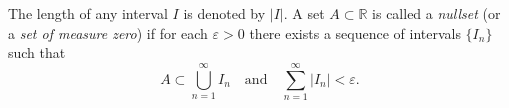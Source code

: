 The length of any interval $I$ is denoted by $|I|$. A set $A \subset \mathbb{R}$ is called a \textit{nullset} (or a \textit{set of measure zero}) if for each $\varepsilon > 0$ there exists a sequence of intervals $\{I_n\}$ such that
$$A \subset \bigcup_{n=1}^{\infty} I_n \quad\text{and}\quad \sum_{n=1}^{\infty} |I_n| < \varepsilon.$$
